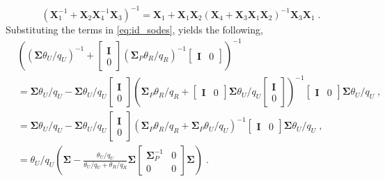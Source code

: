 \begin{equation}
	\left(\bm{X}^{-1}_1 + \bm{X}_2\bm{X}^{-1}_{4}\bm{X}_3\right)^{-1} = \bm{X}_1 + \bm{X}_1\bm{X}_2\left(\bm{X}_4 + \bm{X}_3\bm{X}_1\bm{X}_2\right)^{-1}\bm{X}_3\bm{X}_1\;.
	\label{eq:id_sodes}
\end{equation}
Substituting the terms in \eqref{eq:id_sodes}, yields the following,
\begin{equation*}
	\begin{split}
		& \left(\left(\bm{\Sigma}\theta_U/q_U\right)^{-1}+\begin{bmatrix}
			\bm{I}\\
			0
		\end{bmatrix}
		\left(\bm{\Sigma}_P \theta_R/q_R\right)^{-1}\begin{bmatrix}
			\bm{I} & 0
		\end{bmatrix}\right)^{-1}\\ 
		&= \bm{\Sigma}\theta_U/q_U -\bm{\Sigma}\theta_U/q_U\begin{bmatrix}
			\bm{I}\\
			0
		\end{bmatrix}
		\left(\bm{\Sigma}_P \theta_R/q_R + \begin{bmatrix}
			\bm{I} & 0
		\end{bmatrix}
		\bm{\Sigma}\theta_U/q_U\begin{bmatrix}
			\bm{I}\\
			0
		\end{bmatrix}
		\right)^{-1}
		\begin{bmatrix}
			\bm{I} & 0
		\end{bmatrix}
		\bm{\Sigma}\theta_U/q_U\;,\\
		&= \bm{\Sigma}\theta_U/q_U - \bm{\Sigma}\theta_U/q_U\begin{bmatrix}
			\bm{I}\\
			0
		\end{bmatrix}
		\left(\bm{\Sigma}_P \theta_R/q_R + \bm{\Sigma}_P\theta_U/q_U\right)^{-1}\begin{bmatrix}
			\bm{I} & 0
		\end{bmatrix}
		\bm{\Sigma}\theta_U/q_U\;,\\
		&= \theta_U/q_U\left(\bm{\Sigma} - \frac{\theta_U/q_U}{\theta_U/q_U + \theta_R/q_R}\bm{\Sigma}\begin{bmatrix}
			\bm{\Sigma}^{-1}_{P} & 0\\
			0 & 0
		\end{bmatrix}
		\bm{\Sigma}
		\right)\;.
	\end{split}
\end{equation*}
